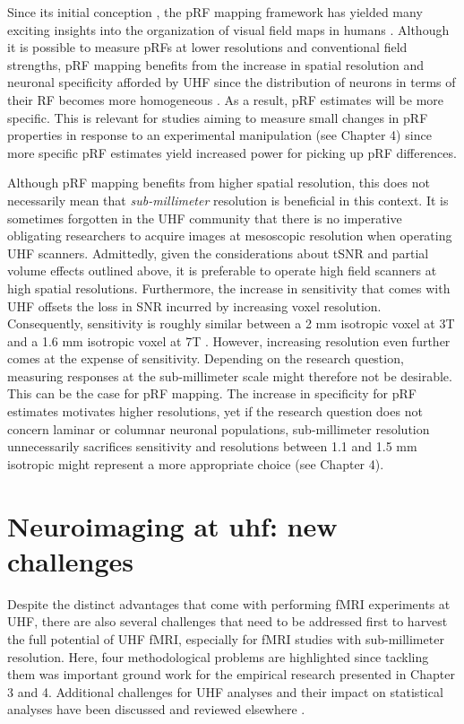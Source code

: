 Since its initial conception \parencite{Dumoulin2008}, the pRF mapping framework has yielded many exciting insights into the organization of visual field maps in humans \parencite{Amano2009, Winawer2010, Harvey2011, Zuiderbaan2012, Kay2013, Klein2014, Kay2015, Harvey2015, Fracasso2016}. Although it is possible to measure pRFs at lower resolutions and conventional field strengths, pRF mapping benefits from the increase in spatial resolution and neuronal specificity afforded by UHF since the distribution of neurons in terms of their RF becomes more homogeneous \parencite{DeMartino2016}. As a result, pRF estimates will be more specific. This is relevant for studies aiming to measure small changes in pRF properties in response to an experimental manipulation (see Chapter 4) since more specific pRF estimates yield increased power for picking up pRF differences.

Although pRF mapping benefits from higher spatial resolution, this does not necessarily mean that \textit{sub-millimeter} resolution is beneficial in this context. It is sometimes forgotten in the UHF community that there is no imperative obligating researchers to acquire images at mesoscopic resolution when operating UHF scanners. Admittedly, given the considerations about tSNR and partial volume effects outlined above, it is preferable to operate high field scanners at high spatial resolutions. Furthermore, the increase in sensitivity that comes with UHF offsets the loss in SNR incurred by increasing voxel resolution. Consequently, sensitivity is roughly similar between a 2 mm isotropic voxel at 3T and a 1.6 mm isotropic voxel at 7T \parencite{DeMartino2016}. However, increasing resolution even further comes at the expense of sensitivity. Depending on the research question, measuring responses at the sub-millimeter scale might therefore not be desirable. This can be the case for pRF mapping. The increase in specificity for pRF estimates motivates higher resolutions, yet if the research question does not concern laminar or columnar neuronal populations, sub-millimeter resolution unnecessarily sacrifices sensitivity and resolutions between 1.1 and 1.5 mm isotropic might represent a more appropriate choice (see Chapter 4).

\section{Neuroimaging at uhf: new challenges}
Despite the distinct advantages that come with performing fMRI experiments at UHF, there are also several challenges that need to be addressed first to harvest the full potential of UHF fMRI, especially for fMRI studies with sub-millimeter resolution. Here, four methodological problems are highlighted since tackling them was important ground work for the empirical research presented in Chapter 3 and 4. Additional challenges for UHF analyses and their impact on statistical analyses have been discussed and reviewed elsewhere \parencite{Polimeni2017, DeMartino2016}.


